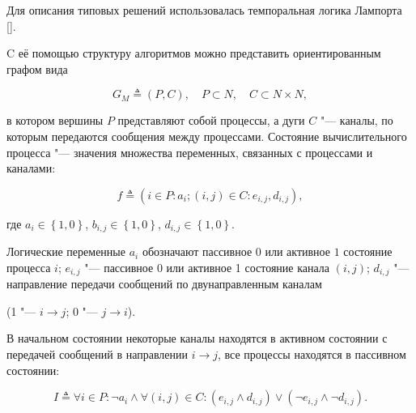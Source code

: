 \smallskip




Для описания типовых решений использовалась темпоральная логика Лампорта []. 

C её помощью структуру алгоритмов можно представить ориентированным графом вида

\begin{equation}

G_{M}\triangleq\left(P,C\right),\quad P\subset N, \quad C\subset N\times N,

\label{eqGraph}

\end{equation}

в котором вершины $P$ представляют собой процессы, а дуги $C$ "--- каналы, по которым передаются сообщения между процессами. Состояние вычислительного процесса "--- значения множества переменных, связанных с процессами и каналами:

$$

f\triangleq\left(i\in P\colon a_{i}; \left(i,j\right)\in C\colon e_{i,j}, d_{i,j}\right),


$$

где $a_{i}\in\left\{1, 0\right\}$, $b_{i,j}\in\left\{1, 0\right\}$, $d_{i,j}\in\left\{1, 0\right\}$.



Логические переменные $a_{i}$ обозначают пассивное $0$ или активное $1$ состояние процесса $i$; $e_{i,j}$ "--- пассивное 0 или активное 1 состояние канала $\left(i,j\right)$; $d_{i,j}$ "--- направление передачи сообщений по двунаправленным каналам 

(1 "--- $i\rightarrow j$; 0 "--- $j\rightarrow i$).



В начальном состоянии некоторые каналы находятся в активном состоянии с передачей сообщений в направлении $i\rightarrow j$, все процессы находятся в пассивном состоянии:

$$

I\triangleq\forall i\in P\colon\neg a_{i}\wedge\forall\left(i,j\right)\in C\colon\left(e_{i,j}\wedge d_{i,j}\right)\vee\left(\neg e_{i,j}\wedge\neg d_{i,j}\right).


$$



